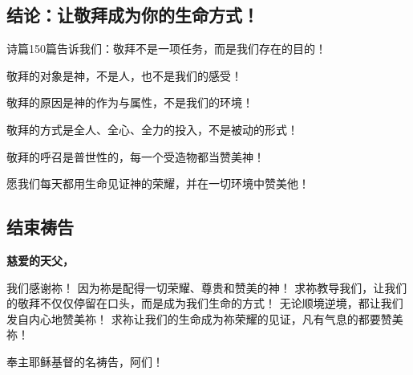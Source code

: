 \documentclass[a4paper, 12pt]{article}
\begin{document}
\subsection*{结论：让敬拜成为你的生命方式！}
诗篇150篇告诉我们：敬拜不是一项任务，而是我们存在的目的！

敬拜的对象是神，不是人，也不是我们的感受！

敬拜的原因是神的作为与属性，不是我们的环境！

敬拜的方式是全人、全心、全力的投入，不是被动的形式！

敬拜的呼召是普世性的，每一个受造物都当赞美神！

愿我们每天都用生命见证神的荣耀，并在一切环境中赞美他！

\subsection*{结束祷告}
\textbf{慈爱的天父，}

我们感谢祢！
因为祢是配得一切荣耀、尊贵和赞美的神！
求祢教导我们，让我们的敬拜不仅仅停留在口头，而是成为我们生命的方式！
无论顺境逆境，都让我们发自内心地赞美祢！
求祢让我们的生命成为祢荣耀的见证，凡有气息的都要赞美祢！

奉主耶稣基督的名祷告，阿们！

\end{document}
